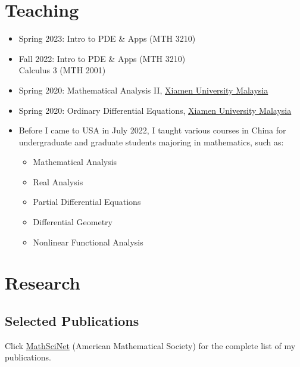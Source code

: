 \documentclass[12pt]{amsproc}
\begin{document}
\section{Teaching}

\begin{itemize}
\item Spring 2023: Intro to PDE \& Apps (MTH 3210)
\item Fall 2022: Intro to PDE \& Apps (MTH 3210)\\
\phantom{Fall 2022: }Calculus 3 (MTH 2001)
\item Spring 2020: Mathematical Analysis II, \href{http://www.xmu.edu.my}{Xiamen University
Malaysia}
\item Spring 2020: Ordinary Differential Equations, \href{http://www.xmu.edu.my}{Xiamen University
Malaysia}
\item Before I came to USA in July 2022, I taught various courses in China for undergraduate and graduate students majoring in mathematics, such as:
\begin{multicols}{2}
\begin{itemize}
\item Mathematical Analysis\\
\item Real Analysis\\
\item Partial Differential Equations\\
\item Differential Geometry\\
\item Nonlinear Functional Analysis
\end{itemize}
\end{multicols}


\end{itemize}

\section{Research}

\subsection{Selected Publications}

Click \href{https://mathscinet.ams.org/mathscinet/search/author.html?mrauthid=671940}{MathSciNet} (American Mathematical Society) for the complete list of my publications.


\nocite{*}

\end{document}
